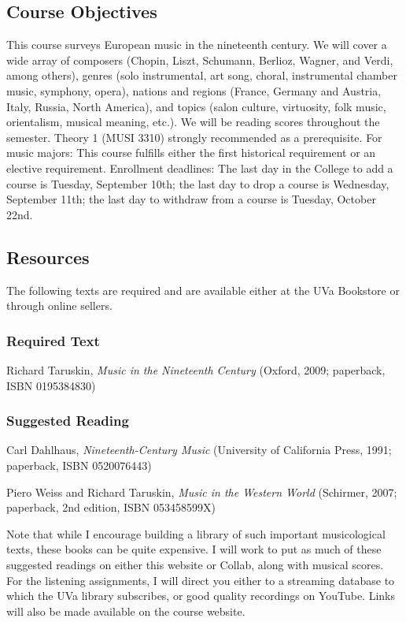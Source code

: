 \documentclass[letterpaper,10pt,english]{sphinxmanual}
\begin{document}
\subsection{Course Objectives}
\label{syllabus:course-objectives}
This course surveys European music in the nineteenth century.
We will cover a wide array of composers (Chopin, Liszt, Schumann, Berlioz,
Wagner, and Verdi, among others), genres (solo instrumental, art song, choral,
instrumental chamber music, symphony, opera), nations and regions (France,
Germany and Austria, Italy, Russia, North America), and topics (salon culture, virtuosity,
folk music, orientalism, musical meaning, etc.).
\textbar{}
We will be reading scores throughout the semester. Theory 1 (MUSI 3310) strongly recommended as a prerequisite.
\textbar{}
For music majors: This course fulfills either the
first historical requirement or an elective requirement.
\textbar{}
Enrollment deadlines: The last day in the College to add a course is Tuesday,
September 10th; the last day to drop a course is Wednesday, September 11th;
the last day to withdraw from a course is Tuesday, October 22nd.


\subsection{Resources}
\label{syllabus:resources}
The following texts are required and are available either at the UVa Bookstore or through online sellers.


\subsubsection{Required Text}
\label{syllabus:required-text}
Richard Taruskin, \emph{Music in the Nineteenth Century} (Oxford, 2009; paperback, ISBN 0195384830)


\subsubsection{Suggested Reading}
\label{syllabus:suggested-reading}
Carl Dahlhaus, \emph{Nineteenth-Century Music} (University of California Press, 1991; paperback, ISBN 0520076443)

Piero Weiss and Richard Taruskin, \emph{Music in the Western World} (Schirmer, 2007; paperback, 2nd edition, ISBN 053458599X)

Note that while I encourage building a library of such important
musicological texts, these books can be quite expensive. I will work
to put as much of these suggested readings on either this website or
Collab, along with musical scores. For the listening assignments, I will
direct you either to a streaming database to which the UVa library subscribes,
or good quality recordings on YouTube. Links will also be
made available on the course website.
\end{document}
